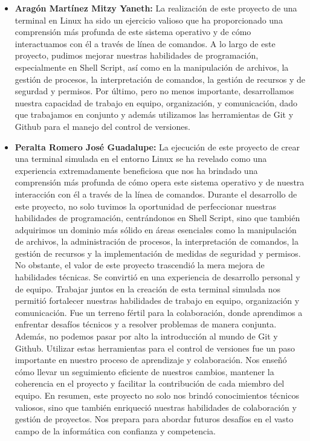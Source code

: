 \documentclass[12pt,a4paper]{article}
\begin{document}
\begin{itemize}
    \item \textbf{Aragón Martínez Mitzy Yaneth:}  La realización de este proyecto de una terminal en Linux ha sido un ejercicio valioso que ha proporcionado una comprensión más profunda de este sistema operativo y de cómo interactuamos con él a través de línea de comandos. A lo largo de este proyecto, pudimos mejorar nuestras habilidades de programación, especialmente en Shell Script, así como en la manipulación de archivos, la gestión de procesos, la interpretación de comandos, la gestión de recursos y de segurdad y permisos. Por último, pero no menos importante, desarrollamos nuestra capacidad de trabajo en equipo, organización, y comunicación, dado que trabajamos en conjunto y además utilizamos las herramientas de Git y Github para el manejo del control de versiones.
    
    \item \textbf{Peralta Romero José Guadalupe:} La ejecución de este proyecto de crear una terminal simulada en el entorno Linux se ha revelado como una experiencia extremadamente beneficiosa que nos ha brindado una comprensión más profunda de cómo opera este sistema operativo y de nuestra interacción con él a través de la línea de comandos. Durante el desarrollo de este proyecto, no solo tuvimos la oportunidad de perfeccionar nuestras habilidades de programación, centrándonos en Shell Script, sino que también adquirimos un dominio más sólido en áreas esenciales como la manipulación de archivos, la administración de procesos, la interpretación de comandos, la gestión de recursos y la implementación de medidas de seguridad y permisos. No obstante, el valor de este proyecto trascendió la mera mejora de habilidades técnicas. Se convirtió en una experiencia de desarrollo personal y de equipo. Trabajar juntos en la creación de esta terminal simulada nos permitió fortalecer nuestras habilidades de trabajo en equipo, organización y comunicación. Fue un terreno fértil para la colaboración, donde aprendimos a enfrentar desafíos técnicos y a resolver problemas de manera conjunta. Además, no podemos pasar por alto la introducción al mundo de Git y Github. Utilizar estas herramientas para el control de versiones fue un paso importante en nuestro proceso de aprendizaje y colaboración. Nos enseñó cómo llevar un seguimiento eficiente de nuestros cambios, mantener la coherencia en el proyecto y facilitar la contribución de cada miembro del equipo. En resumen, este proyecto no solo nos brindó conocimientos técnicos valiosos, sino que también enriqueció nuestras habilidades de colaboración y gestión de proyectos. Nos prepara para abordar futuros desafíos en el vasto campo de la informática con confianza y competencia.
\end{itemize}

\newpage
% 
% 
\end{document}
